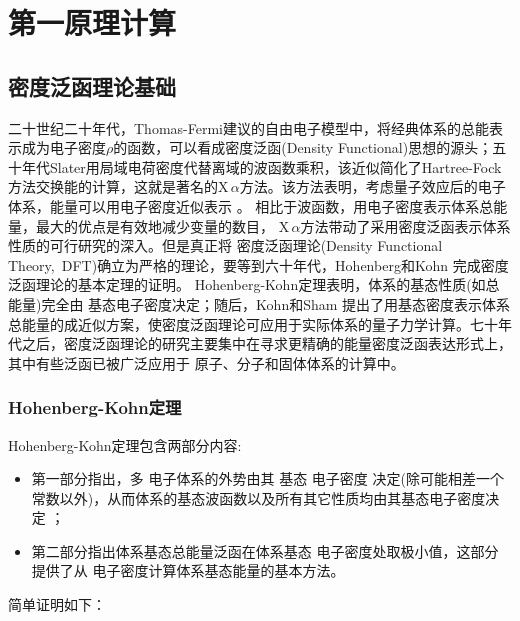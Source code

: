 \setcounter{chapter}{11}
\chapter{第一原理计算}\label{chap:quantum-calculation}
\section{密度泛函理论基础} \label{section:dft}

二十世纪二十年代，Thomas-Fermi{建议的自由电子模型}\cite{PCPS23-542_1927,ZP48-73_1928}中，将经典体系的总能表示成为电子密度$\rho$的函数\cite{Parr-Yang,CR91-651_1991}，可以看成密度泛函(Density Functional)思想的源头；五十年代Slater用局域电荷密度代替离域的波函数乘积，该近似简化了Hartree-Fock方法\cite{MPCPS24-111_1928,ZP61-126_1930, PR32-339_1928}交换能的计算，这就是著名的X\,$\alpha$方法\cite{PR81-385_1951}。该方法表明，考虑量子效应后的电子体系，能量可以用电子密度近似表示
。%
相比于波函数，用电子密度表示体系总能量，最大的优点是有效地减少变量的数目，%
X\,$\alpha$方法带动了采用密度泛函表示体系性质的可行研究的深入。但是真正将
密度泛函理论\textrm{(Density Functional Theory,~DFT)}确立为严格的理论，要等到六十年代，Hohenberg和Kohn%
完成密度泛函理论的基本定理的证明\cite{PR136-B864_1964}。
Hohenberg-Kohn定理表明，体系的基态性质(如总能量)完全由%
基态{电}子密度决定；随后，Kohn和Sham\cite{PR140-A1133_1965}%
{提出了用基态密度表示体系总能量的成近似方案，使密度泛函理论可应用于实际体系的量子力学计算。七十年代之后，密度泛函理论的研究主要集中在寻求更精确的能量密度泛函表达形式上，其中有些泛函已被}广泛应用于%
原子、分子和固体体系{的计算中\cite{CJP58-1200_1980,PRB45-13244_1992,PRA38-3098_1988,PRB33-8822_1986,PRB37-785_1988}}。

\subsection{Hohenberg-Kohn定理}
Hohenberg-Kohn定理\cite{PR136-B864_1964}包含两部分{内容}:
\begin{itemize}
	\item 第一部分指出，多%
{电}子体系的外势由其%
基态%
{电}子密度%
决定(除可能相差一个常数以外)，从而体系的基态波函数以及所有其它性质均由其基态电子密度决定
；\item 第二部分指出体系基态总能量{泛函}在体系基态%
{电}子密度处取极小{值}，这部分%
{提供}了从%
{电}子密度计算体系基态能量的基本方法。
\end{itemize}
简单证明如下：

